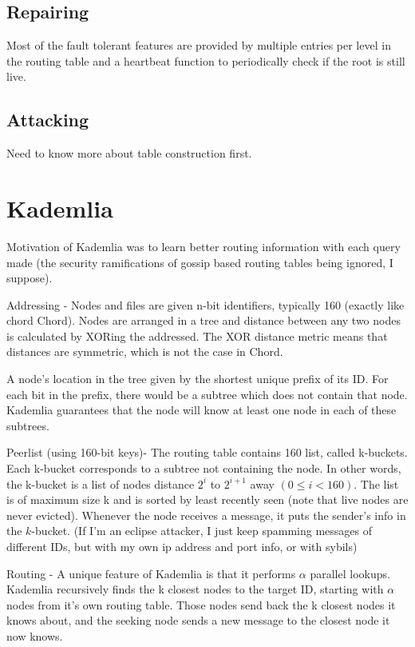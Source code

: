 \documentclass[10pt,letterpaper]{report}
\begin{document}
\subsection*{Repairing}
Most of the fault tolerant features are provided by multiple entries per level  in the routing table and a heartbeat function to periodically check if the root is still live.


\subsection*{Attacking}
Need to know more about table construction first.


\section{Kademlia}

\cite{kademlia}
Motivation of Kademlia was to learn better routing information with each query made (the security ramifications of gossip based routing tables being ignored, I suppose).

Addressing  -  Nodes and files are given n-bit identifiers, typically 160 (exactly like chord Chord).  Nodes are arranged in a tree and distance between any two nodes is calculated by XORing the addressed.  The XOR distance metric means that distances are symmetric, which is not the case in Chord.

A node's location in the tree given by the shortest unique prefix of its ID.   For each bit in the prefix, there would be a subtree which does not contain that node.  Kademlia guarantees that the node will know at least one node in each of these subtrees.


Peerlist  (using 160-bit keys)-  The routing table contains 160 list, called k-buckets.  Each k-bucket corresponds to a subtree not containing the node. In other words, the k-bucket is a list of nodes distance $2^i$ to $2^{i+1}$ away $(0 \leq i < 160)$.  The list is of maximum size k and is sorted by least recently seen  (note that live nodes are never evicted).  Whenever the node receives a message, it puts the sender's info in the $k$-bucket.  
(If I'm an eclipse attacker, I just keep spamming messages of different IDs, but with my own ip address and port info, or with sybils)



Routing  -  A unique feature of Kademlia is that it performs $\alpha$ parallel lookups.    Kademlia recursively finds the k closest nodes to the target ID, starting with $\alpha$ nodes from it's own routing table.  Those nodes send back the k closest nodes it knows about, and the seeking node sends a new message to the closest node it now knows.
\end{document}
